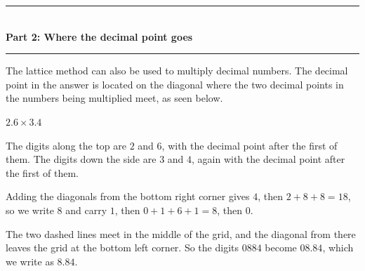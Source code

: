 \documentclass[12pt,a4paper]{article}
\newcommand{\heading}[1]{%
  \vspace{2pt}
  {\color{blue!45!black}\rule{\linewidth}{1pt}}\\[1pt]
  {\large\bfseries #1}\\[-6pt]
  {\color{blue!45!black}\rule{\linewidth}{0.4pt}}
  \vspace{2pt}}
\newcommand{\parttitle}[2]{\heading{Part #1: #2}}
\newcommand{\lsetup}[2]{%
  \edef\lC{\the\numexpr#1\relax}\edef\lR{\the\numexpr#2\relax}%
  \edef\lCm{\the\numexpr#1-1\relax}\edef\lRm{\the\numexpr#2-1\relax}}
\newcommand{\lgrid}{%
  \draw[thick] (0,0) rectangle (\lC,\lR);
  \foreach \i in {1,...,\lCm}{\draw (\i,0) -- (\i,\lR);}
  \foreach \j in {1,...,\lRm}{\draw (0,\j) -- (\lC,\j);}
  \foreach \i in {1,...,\lC}{\foreach \j in {1,...,\lR}{%
    \draw[gray!75] ({\i-1},{\j-1}) -- (\i,\j);}}}
\newcommand{\ltop}[2]{\node[font=\small] at ({#1-0.5},{\lR+0.34}) {#2};}
\newcommand{\lside}[2]{\node[font=\small] at ({\lC+0.34},{\lR-#1+0.5}) {#2};}
\newcommand{\lcell}[4]{%
  \node[font=\small] at ({#1-0.72},{\lR-#2+0.70}) {#3};
  \node[font=\small] at ({#1-0.28},{\lR-#2+0.30}) {#4};}
\newcommand{\lleft}[2]{\node[font=\small] at (-0.44,{\lR-#1+0.5}) {#2};}
\newcommand{\lbot}[2]{\node[font=\small] at ({#1-0.5},-0.42) {#2};}
\newcommand{\ltopdot}[1]{\fill (#1,{\lR+0.2}) circle (1.8pt);}
\newcommand{\lsidedot}[1]{\fill ({\lC+0.34},{\lR-#1}) circle (1.8pt);}
\newcommand{\lmeet}[2]{%
  \pgfmathsetmacro{\lmx}{#1}%
  \pgfmathsetmacro{\lmy}{\lR-#2}%
  \pgfmathsetmacro{\lts}{min(\lmx,\lmy)}%
  \pgfmathsetmacro{\lex}{\lmx-\lts}%
  \pgfmathsetmacro{\ley}{\lmy-\lts}%
  \pgfmathsetmacro{\ldx}{\lex<0.5 ? -0.44 : \lex}%
  \pgfmathsetmacro{\ldy}{\ley<0.5 ? -0.42 : \ley}}
\newcommand{\ltrace}[2]{\lmeet{#1}{#2}%
  \draw[red!75!black,dashed,-{Stealth[length=2mm]}] ({\lmx},{\lR+0.1}) -- ({\lmx},{\lmy});
  \draw[red!75!black,dashed,-{Stealth[length=2mm]}] ({\lC+0.12},{\lmy}) -- ({\lmx},{\lmy});
  \ifdim\lts pt>0.1pt
    \draw[red!75!black,dashed,thick,-{Stealth[length=2mm]}] ({\lmx},{\lmy}) -- ({\lex},{\ley});
  \fi
  \fill[red!75!black] ({\ldx},{\ldy}) circle (2.1pt);}
\begin{document}
\parttitle{2}{Where the decimal point goes}

The lattice method can also be used to multiply decimal numbers. The decimal point in the answer is located on the diagonal where the two decimal points in the numbers being multiplied meet, as seen below.

\begin{wex}{$2.6\times3.4$}
\small
\begin{minipage}[t]{0.40\linewidth}
\centering
{}
\end{minipage}%
\begin{minipage}[t]{0.60\linewidth}
\vspace{2pt}
The digits along the top are $2$ and $6$, with the decimal point after the
first of them. The digits down the side are $3$ and $4$, again with the decimal
point after the first of them.

\smallskip
Adding the diagonals from the bottom right corner gives $4$, then
$2+8+8=18$, so we write $8$ and carry $1$, then $0+1+6+1=8$, then $0$.

\smallskip
The two dashed lines meet in the middle of the grid, and the diagonal from
there leaves the grid at the bottom left corner. So the digits $0884$ become
$08.84$, which we write as $8.84$.
\end{minipage}
\end{wex}
\end{document}
